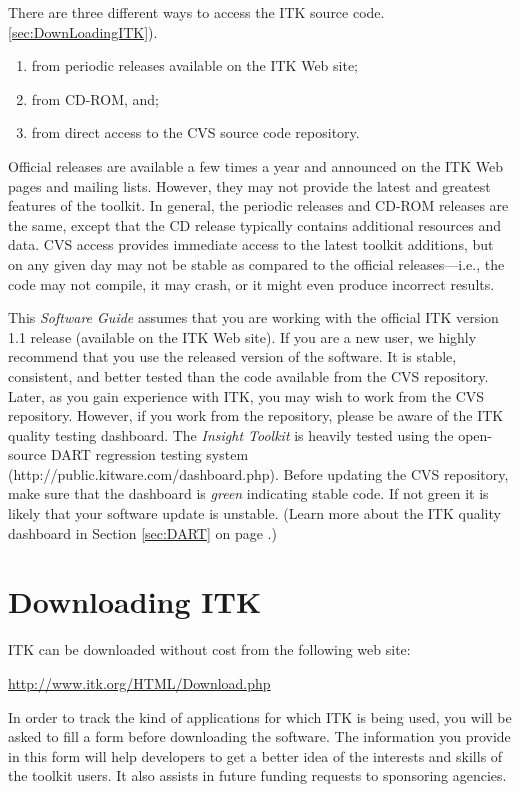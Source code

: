 There are three different ways to access the ITK source code.
\ref{sec:DownLoadingITK}).
\begin{enumerate}
	\item	from periodic releases available on the ITK Web site;
	\item	from CD-ROM, and;
	\item	from direct access to the CVS source code repository.
\end{enumerate}
Official releases are available a few times a year and announced on the ITK
Web pages and mailing lists. However, they may not provide the latest and
greatest features of the toolkit. In general, the periodic releases and
CD-ROM releases are the same, except that the CD release typically contains
additional resources and data. CVS access provides immediate access to the
latest toolkit additions, but on any given day may not be stable as compared
to the official releases---i.e., the code may not compile, it may crash, or
it might even produce incorrect results.

This \emph{Software Guide} assumes that you are working with the official ITK
version 1.1 release (available on the ITK Web site). If you are a new user,
we highly recommend that you use the released version of the software. It is
stable, consistent, and better tested than the code available from the CVS
repository. Later, as you gain experience with ITK, you may wish to work from
the CVS repository. However, if you work from the repository, please be aware
of the ITK quality testing dashboard. The \emph{Insight Toolkit} is heavily
tested using the open-source DART regression testing system
(http://public.kitware.com/dashboard.php). Before updating the CVS
repository, make sure that the dashboard is \emph{green} indicating stable
code. If not green it is likely that your software update is unstable. (Learn
more about the ITK quality dashboard in Section
\ref{sec:DART} on page \pageref{sec:DART}.)

\section{Downloading ITK}
\label{sec:DownloadingITK}
 

ITK can be downloaded without cost from the following web site:
\begin{center} 
  \url{http://www.itk.org/HTML/Download.php}
\end{center}
In order to track the kind of applications for which ITK is being used, you
will be asked to fill a form before downloading the software.
The information you provide in this form will help developers to get a better
idea of the interests and skills of the toolkit users. It also assists in 
future funding requests to sponsoring agencies.

